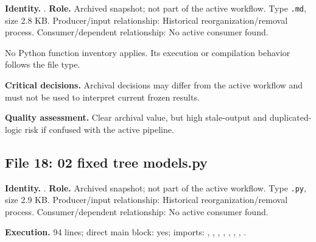 \documentclass[
  11pt,
  a4paper]{article}
\begin{document}
\textbf{Identity.}
.
\textbf{Role.} Archived snapshot; not part of the active workflow. Type
\texttt{.md}, size 2.8 KB. Producer/input relationship: Historical
reorganization/removal process. Consumer/dependent relationship: No
active consumer found.

No Python function inventory applies. Its execution or compilation
behavior follows the file type.

\textbf{Critical decisions.} Archival decisions may differ from the
active workflow and must not be used to interpret current frozen
results.

\textbf{Quality assessment.} Clear archival value, but high stale-output
and duplicated-logic risk if confused with the active pipeline.

\subsection{File 18: 02 fixed tree
models.py}\label{file-4155924752409159947}

\textbf{Identity.}
.
\textbf{Role.} Archived snapshot; not part of the active workflow. Type
\texttt{.py}, size 2.9 KB. Producer/input relationship: Historical
reorganization/removal process. Consumer/dependent relationship: No
active consumer found.

\textbf{Execution.} 94 lines; direct main block: yes; imports:
, ,
,
,
,
,
, .
\end{document}
